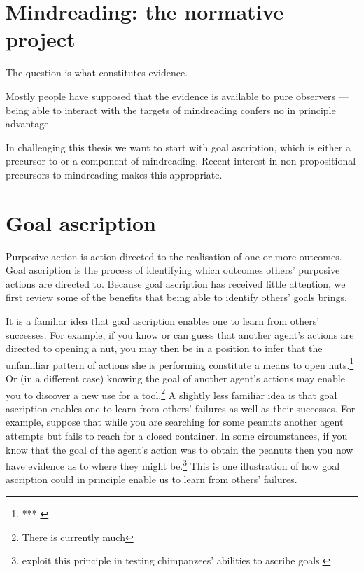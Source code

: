 \documentclass[14pt,a4paper]{extarticle}
\begin{document}
\setlength\footnotesep{1em}


\maketitle

\begin{abstract}
***
\end{abstract}


\section{Mindreading: the normative project}

The question is what constitutes evidence.

Mostly people have supposed that the evidence is available to pure observers --- being able to interact with the targets of mindreading confers no in principle advantage.

In challenging this thesis we want to start with goal ascription, which is either a precursor to or a component of mindreading.
Recent interest in non-propositional precursors to mindreading makes this appropriate.


\section{Goal ascription}
Purposive action is action directed to the realisation of one or more outcomes.
Goal ascription is the process of identifying which outcomes others' purposive actions are directed to.
Because goal ascription has received little attention,
we  first review some of the benefits that being able to identify others' goals brings.

It is a familiar idea that goal ascription enables one to learn from others' successes.
For example,
if you know or can guess that another agent's actions are directed to opening a nut,
you may then be in a position to infer that the unfamiliar pattern of actions she is performing constitute a means to open nuts.\footnote{
***
\citep{Horner:2005pj}
}
Or (in a different case) knowing the goal of another agent's actions may enable you to discover a new use for a tool.\footnote{
There is currently much 
}
A slightly less familiar idea is that goal ascription enables one to learn from others' failures as well as their successes.
For example, suppose that while you are searching for some peanuts 
another agent attempts but fails to reach for a closed container.
In some circumstances,
if you know that the goal of the agent's action was to obtain the peanuts
then you now have evidence as to where they might be.\footnote{
\citet{hare_chimpanzees_2004} exploit this principle in testing chimpanzees' abilities to ascribe goals.
}
This is one illustration of how goal ascription could in principle enable us to learn from others' failures.
\end{document}

